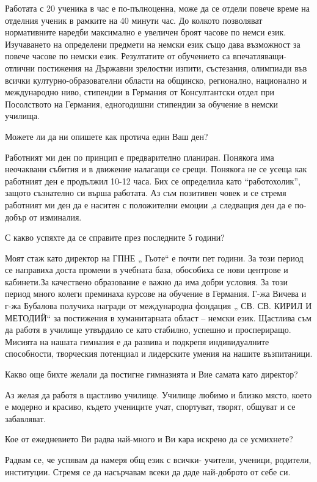\begin{multicols}{3}
Работата с 20 ученика в час е по-пълноценна, може да се отдели повече време на отделния ученик в рамките на 40 минути час. До колкото  позволяват нормативните наредби максимално е увеличен броят часове по немси език. Изучаването на определени предмети на немски език също дава възможност за повече часове по немски език. Резултатите от обучението са впечатляващи- отлични постижения на Държавни зрелостни изпити, състезания, олимпиади във всички културно-образователни области на общинско, регионално, национално и международно ниво, стипендии в Германия от Консултантски отдел при Посолството на Германия, едногодишни стипендии за обучение в немски училища.

Можете ли да ни опишете как протича един Ваш ден?

Работният ми ден по принцип е предварително планиран. Понякога има неочаквани събития и в движение налагащи се срещи. Понякога не се усеща как работният ден е продължил 10-12 часа. Бих се определила като “работохолик”, защото съзнателно си върша работата. Аз съм позитивен човек и се стремя работният ми ден да е наситен с положителни емоции ,а следващия ден да е по-добър от изминалия.

С какво успяхте да се справите през последните 5 години?

Моят стаж като директор на ГПНЕ „ Гьоте“ е почти пет години. За този период се направиха доста промени в учебната база, обособиха се нови центрове и кабинети.За качествено образование е важно да има добри условия. За този период много колеги преминаха курсове на обучение в Германия. Г-жа Вичева и  г-жа Бубалова получиха награди от международна фондация „ СВ. СВ. КИРИЛ И МЕТОДИЙ“ за постижения в хуманитарната област – немски език. Щастлива съм да работя в училище утвърдило се като  стабилно, успешно и  проспериращо. Мисията на нашата гимназия е да развива и подкрепя индивидуалните способности, творческия потенциал и лидерските умения на нашите възпитаници.

Какво още бихте желали да постигне гимназията и Вие самата като директор?

Аз желая да работя в щастливо училище. Училище  любимо и  близко място, което е модерно и красиво,  където учениците учат,  спортуват,  творят,  общуват и се забавляват.

Кое от ежедневието Ви радва най-много и Ви кара искрено да се усмихнете?

Радвам се, че успявам да намеря общ език с всички- учители, ученици, родители, институции. Стремя се да насърчавам всеки да даде най-доброто от себе си.
 

\end{multicols}
